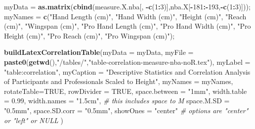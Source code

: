 \documentclass[]{article}
\newenvironment{Shaded}{\begin{snugshade}}{\end{snugshade}}
\newcommand{\CommentTok}[1]{\textcolor[rgb]{0.56,0.35,0.01}{\textit{#1}}}
\newcommand{\DataTypeTok}[1]{\textcolor[rgb]{0.13,0.29,0.53}{#1}}
\newcommand{\DecValTok}[1]{\textcolor[rgb]{0.00,0.00,0.81}{#1}}
\newcommand{\FloatTok}[1]{\textcolor[rgb]{0.00,0.00,0.81}{#1}}
\newcommand{\KeywordTok}[1]{\textcolor[rgb]{0.13,0.29,0.53}{\textbf{#1}}}
\newcommand{\NormalTok}[1]{#1}
\newcommand{\OperatorTok}[1]{\textcolor[rgb]{0.81,0.36,0.00}{\textbf{#1}}}
\newcommand{\OtherTok}[1]{\textcolor[rgb]{0.56,0.35,0.01}{#1}}
\newcommand{\StringTok}[1]{\textcolor[rgb]{0.31,0.60,0.02}{#1}}
\begin{document}
\begin{Shaded}
\begin{Highlighting}[]
\NormalTok{myData =}\StringTok{ }\KeywordTok{as.matrix}\NormalTok{(}\KeywordTok{cbind}\NormalTok{(measure.X.nba[, }\OperatorTok{-}\KeywordTok{c}\NormalTok{(}\DecValTok{1}\OperatorTok{:}\DecValTok{3}\NormalTok{)],nba.X[}\OperatorTok{-}\DecValTok{181}\OperatorTok{:-}\DecValTok{193}\NormalTok{,}\OperatorTok{-}\KeywordTok{c}\NormalTok{(}\DecValTok{1}\OperatorTok{:}\DecValTok{3}\NormalTok{)]));}
\NormalTok{myNames =}\StringTok{ }\KeywordTok{c}\NormalTok{(}\StringTok{"Hand Length (cm)"}\NormalTok{, }\StringTok{"Hand Width (cm)"}\NormalTok{,  }\StringTok{"Height (cm)"}\NormalTok{, }\StringTok{"Reach (cm)"}\NormalTok{, }\StringTok{"Wingspan (cm)"}\NormalTok{,}
            \StringTok{"Pro Hand Length (cm)"}\NormalTok{, }\StringTok{"Pro Hand Width (cm)"}\NormalTok{, }\StringTok{"Pro Height (cm)"}\NormalTok{, }\StringTok{"Pro Reach (cm)"}\NormalTok{, }\StringTok{"Pro Wingspan (cm)"}\NormalTok{);}


\KeywordTok{buildLatexCorrelationTable}\NormalTok{(}\DataTypeTok{myData =}\NormalTok{ myData, }
                                \DataTypeTok{myFile =} \KeywordTok{paste0}\NormalTok{(}\KeywordTok{getwd}\NormalTok{(),}\StringTok{"/tables/"}\NormalTok{,}\StringTok{"table-correlation-measure-nba-noR.tex"}\NormalTok{),}
                                \DataTypeTok{myLabel =} \StringTok{"table:correlation"}\NormalTok{,}
                                \DataTypeTok{myCaption =} \StringTok{"Descriptive Statistics and Correlation Analysis of Participants and Professionals Scaled to Height"}\NormalTok{,}
                                \DataTypeTok{myNames =}\NormalTok{ myNames,}
                                \DataTypeTok{rotateTable=}\OtherTok{TRUE}\NormalTok{,}
                                \DataTypeTok{rowDivider =} \OtherTok{TRUE}\NormalTok{,}
                                \DataTypeTok{space.between =} \StringTok{"1mm"}\NormalTok{,}
                                \DataTypeTok{width.table =} \FloatTok{0.99}\NormalTok{,}
                                \DataTypeTok{width.names =} \StringTok{"1.5cm"}\NormalTok{, }\CommentTok{# this includes space to M}
                                \DataTypeTok{space.M.SD =} \StringTok{"0.5mm"}\NormalTok{,}
                                \DataTypeTok{space.SD.corr =} \StringTok{"0.5mm"}\NormalTok{,}
                                \DataTypeTok{showOnes =} \StringTok{"center"} \CommentTok{# options are "center" or "left" or NULL}
\NormalTok{                                )}


\end{Highlighting}
\end{Shaded}
\end{document}
